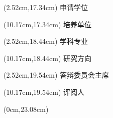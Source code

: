 \begin{titlepage}
\begin{textblock*}{6.2cm}(2.52cm,17.34cm)
    {\songti{}申请学位\JOUUnderlineBox{3.05cm}{\JOUDegree}}
\end{textblock*}
\begin{textblock*}{6.2cm}(10.17cm,17.34cm)
    {\songti{}培养单位\JOUUnderlineBox{3.05cm}{\JOUCollegeDisplay}}
\end{textblock*}

\begin{textblock*}{6.2cm}(2.52cm,18.44cm)
    {\songti{}学科专业\JOUUnderlineBox{3.05cm}{\JOUProgram}}
\end{textblock*}
\begin{textblock*}{6.2cm}(10.17cm,18.44cm)
    {\songti{}研究方向\JOUUnderlineBox{3.05cm}{\JOUResearchDirection}}
\end{textblock*}

\begin{textblock*}{7.0cm}(2.52cm,19.54cm)
    {\songti{}答辩委员会主席\JOUUnderlineBox{2.30cm}{}}
\end{textblock*}
\begin{textblock*}{7.0cm}(10.17cm,19.54cm)
    {\songti{}评\hspace{1em}阅\hspace{1em}人\JOUUnderlineBox{3.05cm}{}}
\end{textblock*}

\begin{textblock*}{21cm}(0cm,23.08cm)
    \centering{\JOUXingkai\fontsize{26pt}{30pt}\selectfont \JOUDate\par}
\end{textblock*}
\vfill\null
\end{titlepage}
